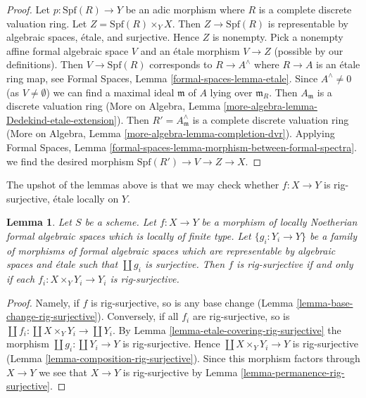 \documentclass{stacks-project}
\theoremstyle{plain}
\newtheorem{lemma}[subsection]{Lemma}
\theoremstyle{definition}
\theoremstyle{remark}
\numberwithin{equation}{subsection}
\begin{document}
\begin{proof}
Let $p : \text{Spf}(R) \to Y$ be an adic morphism where $R$ is a complete
discrete valuation ring. Let $Z = \text{Spf}(R) \times_Y X$. Then
$Z \to \text{Spf}(R)$ is representable by algebraic spaces, \'etale, and
surjective. Hence $Z$ is nonempty. Pick a nonempty affine formal algebraic
space $V$ and an \'etale morphism $V \to Z$ (possible by our definitions).
Then $V \to \text{Spf}(R)$ corresponds to $R \to A^\wedge$ where
$R \to A$ is an \'etale ring map, see Formal Spaces, Lemma
\ref{formal-spaces-lemma-etale}. Since $A^\wedge \not = 0$
(as $V \not = \emptyset$) we can find a maximal ideal $\mathfrak m$
of $A$ lying over $\mathfrak m_R$. Then $A_\mathfrak m$ is a discrete
valuation ring (More on Algebra, Lemma
\ref{more-algebra-lemma-Dedekind-etale-extension}).
Then $R' = A_\mathfrak m^\wedge$ is a complete discrete valuation ring
(More on Algebra, Lemma \ref{more-algebra-lemma-completion-dvr}).
Applying Formal Spaces, Lemma
\ref{formal-spaces-lemma-morphism-between-formal-spectra}.
we find the desired morphism $\text{Spf}(R') \to V \to Z \to X$.
\end{proof}

\noindent
The upshot of the lemmas above is that we may check whether
$f : X \to Y$ is rig-surjective, \'etale locally on $Y$.

\begin{lemma}
\label{lemma-upshot}
Let $S$ be a scheme. Let $f : X \to Y$ be a morphism of locally
Noetherian formal algebraic spaces which is locally of finite type.
Let $\{g_i : Y_i \to Y\}$ be a family of morphisms of formal
algebraic spaces which are representable by algebraic spaces and
\'etale such that $\coprod g_i$ is surjective.
Then $f$ is rig-surjective if and only if each
$f_i : X \times_Y Y_i \to Y_i$ is rig-surjective.
\end{lemma}

\begin{proof}
Namely, if $f$ is rig-surjective, so is any base change
(Lemma \ref{lemma-base-change-rig-surjective}).
Conversely, if all $f_i$ are rig-surjective, so is
$\coprod f_i : \coprod X \times_Y Y_i \to \coprod Y_i$.
By Lemma \ref{lemma-etale-covering-rig-surjective}
the morphism $\coprod g_i : \coprod Y_i \to Y$ is rig-surjective.
Hence $\coprod X \times_Y Y_i \to Y$ is rig-surjective
(Lemma \ref{lemma-composition-rig-surjective}).
Since this morphism factors through $X \to Y$ we see that $X \to Y$
is rig-surjective by Lemma \ref{lemma-permanence-rig-surjective}.
\end{proof}
\end{document}
